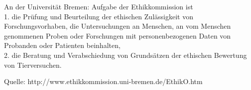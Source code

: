 \begin{frame}

An der Universität Bremen: Aufgabe der Ethikkommission ist\\
1.     die Prüfung und Beurteilung der ethischen Zulässigkeit
       von Forschungsvorhaben, die Untersuchungen an Menschen,
       an vom Menschen genommenen Proben oder Forschungen mit 
       personenbezogenen Daten von Probanden oder Patienten beinhalten,\\
2.     die Beratung und Verabschiedung von Grundsätzen der ethischen 
       Bewertung von Tierversuchen.

\tiny{Quelle: http://www.ethikkommission.uni-bremen.de/EthikO.htm}

\end{frame}



